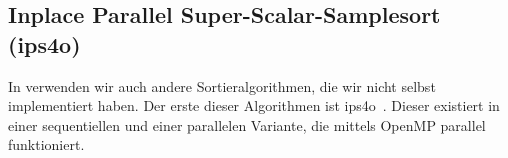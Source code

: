 \subsection{Inplace Parallel Super-Scalar-Samplesort (ips4o)}
\label{section:ips4o}

In \sacabench verwenden wir auch andere Sortieralgorithmen, die wir nicht selbst implementiert haben.
Der erste dieser Algorithmen ist ips4o~\cite{axtmann2017}.
Dieser existiert in einer sequentiellen und einer parallelen Variante,
die mittels OpenMP parallel funktioniert.

\blindtext